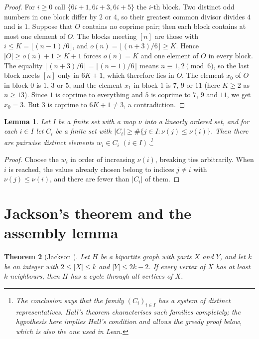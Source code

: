 \documentclass[11pt,a4paper]{article}
\newtheorem{theorem}{Theorem}[section]
\newtheorem{lemma}[theorem]{Lemma}
\theoremstyle{definition}
\theoremstyle{remark}
\begin{document}
\begin{proof}
For $i\ge0$ call $\{6i+1,6i+3,6i+5\}$ the $i$-th block. Two distinct odd numbers in one block differ
by $2$ or $4$, so their greatest common divisor divides $4$ and is $1$. Suppose that $O$ contains no
coprime pair; then each block contains at most one element of $O$. The blocks meeting $[n]$ are those
with $i\le K=\lfloor(n-1)/6\rfloor$, and $o(n)=\lfloor(n+3)/6\rfloor\ge K$. Hence $|O|\ge o(n)+1\ge
K+1$ forces $o(n)=K$ and one element of $O$ in every block. The equality
$\lfloor(n+3)/6\rfloor=\lfloor(n-1)/6\rfloor$ means $n\equiv1,2\pmod 6$, so the last block meets
$[n]$ only in $6K+1$, which therefore lies in $O$. The element $x_0$ of $O$ in block $0$ is $1$, $3$
or $5$, and the element $x_1$ in block $1$ is $7$, $9$ or $11$ (here $K\ge2$ as $n\ge13$). Since $1$
is coprime to everything and $5$ is coprime to $7$, $9$ and $11$, we get $x_0=3$. But $3$ is coprime
to $6K+1\ne3$, a contradiction.
\end{proof}

\begin{lemma}\label{lem:greedy}
Let $I$ be a finite set with a map $\nu$ into a linearly ordered set, and for each $i\in I$ let
$C_i$ be a finite set with $|C_i|\ge\#\{j\in I:\nu(j)\le\nu(i)\}$. Then there are pairwise
distinct elements $w_i\in C_i$ $(i\in I)$.\footnote{The conclusion says that the family
$(C_i)_{i\in I}$ has a system of distinct representatives. Hall's theorem \cite{Hall35} characterises
such families completely; the hypothesis here implies Hall's condition and allows the
greedy proof below, which is also the one used in Lean.}
\end{lemma}

\begin{proof}
Choose the $w_i$ in order of increasing $\nu(i)$, breaking ties arbitrarily. When $i$ is reached, the values already chosen
belong to indices $j\ne i$ with $\nu(j)\le\nu(i)$, and there are fewer than $|C_i|$ of them.
\end{proof}

\section{Jackson's theorem and the assembly lemma}\label{sec:jackson}

\begin{theorem}[Jackson \cite{Jackson81}]\label{thm:jackson}
Let $H$ be a bipartite graph with parts $X$ and $Y$, and let $k$ be an integer with $2\le|X|\le k$ and
$|Y|\le2k-2$. If every vertex of $X$ has at least $k$ neighbours, then $H$ has a cycle through all
vertices of $X$.
\end{theorem}
\end{document}
